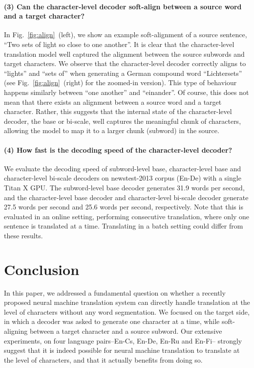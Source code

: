 \documentclass[11pt]{article}
\begin{document}
\paragraph{(3) Can the character-level decoder soft-align between a source
word and a target character?}
In Fig.~\ref{fig:align}~(left), we show an example soft-alignment of a source
sentence, ``Two sets of light so close to one another''. It is clear that the
character-level translation model well captured the alignment between the source
subwords and target characters. We observe that the character-level decoder
correctly aligns to ``lights'' and ``sets of'' when generating a German compound
word ``Lichtersets'' (see Fig.~\ref{fig:align}~(right) for the zoomed-in version).
This type of behaviour happens similarly between ``one another'' and
``einander''. Of course, this does not mean that there exists an alignment
between a source word and a target character.  Rather, this suggests that the
internal state of the character-level decoder, the base or bi-scale, well
captures the meaningful chunk of characters, allowing the model to map it to a larger chunk
(subword) in the source.

\paragraph{(4) How fast is the decoding speed of the character-level decoder?}
We evaluate the decoding speed of subword-level base, character-level base and 
character-level bi-scale decoders on newstest-2013 corpus (En-De) with a single Titan X GPU.
The subword-level base decoder generates 31.9 words per second, and the character-level base decoder
and character-level bi-scale decoder generate 27.5 words per second and 25.6 words per second, respectively.
Note that this is evaluated in an online setting, performing consecutive translation, where only one sentence is translated
at a time. Translating in a batch setting could differ from these results.

\section{Conclusion}
\label{sec:conclusion}

In this paper, we addressed a fundamental question on whether a recently
proposed neural machine translation system can directly handle translation at
the level of characters without any word segmentation. We focused on the target
side, in which a decoder was asked to generate one character at a time, while
soft-aligning between a target character and a source subword.
Our extensive experiments,
on four language pairs--En-Cs, En-De, En-Ru and En-Fi-- strongly
suggest that it is indeed possible for neural machine translation to translate
at the level of characters, and that it actually benefits from doing so.
\end{document}
